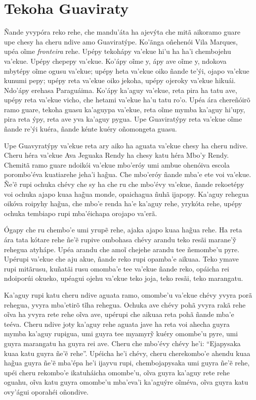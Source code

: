 \chapter*{Tekoha Guaviraty}

Ñande yvypóra reko rehe, che mandu'áta ha ajevýta che mitã aikoramo
guare upe chesy ha cheru ndive amo Guaviratýpe. Ko'ãnga oñehenói Vila
Marques, upéa oĩme \emph{fronteira} rehe. Upépy tekohápy va'ekue hi'u ha
ha'i chembojehu va'ekue. Upépy chepepy va'ekue. Ko'ápy oĩme y, ápy ave
oĩme y, ndokova mbytépy oĩme ogusu va'ekue; upépy heta va'ekue oiko
ñande te'ýi, ojapo va'ekue kunumi pepy; upépy reta va'ekue oiko jekoha,
upépy ojeroky va'ekue hikuái. Ndo'ápy erehasa Paraguáima. Ko'ápy ka'aguy
va'ekue, reta pira ha tatu ave, upépy reta va'ekue vicho, che hetami
va'ekue ha'u tatu ro'o. Upéa ára chereñóirõ ramo guare, tekoha guasu
ka'aguypa va'ekue, reta oĩme mymba ka'aguy hi'upy, pira reta ýpy, reta
ave yva ka'aguy pygua. Upe Guaviratýpy reta va'ekue oĩme ñande re'ýi
kuéra, ñande kénte kuéry oñomongeta guasu.

Upe Guavyratýpy va'ekue reta ary aiko ha aguata va'ekue chesy ha cheru
ndive. Cheru héra va'ekue Ava Jeguaka Rendy ha chesy katu héra Mbo'y
Rendy. Chemitã ramo guare ndoikói va'ekue mbo'eróy umi ambue ohenóiva
escola porombo'éva kuatiarehe jeha'i hag̃ua. Che mbo'eróy ñande mba'e ete
voi va'ekue. Ñe'ẽ rupi ochuka chévy che sy ha che ru che mbo'évy
va'ekue, ñande rekoetépy voi ochuka ajapo kuaa hag̃ua monde, opaichagua
ñuhã ijapopy. Ka'aguy rehegua oikóva roipyhy hag̃ua, che mbo'e renda ha'e
ka'aguy rehe, yrykóta rehe, upépy ochuka tembiapo rupi mba'éichapa
orojapo va'erã.

Ógapy che ru chembo'e umi yrupẽ rehe, ajaka ajapo kuaa hag̃ua rehe. Ha
reta ára tata kótare rehe ñe'ẽ rupive ombohasa chévy arandu teko resãi
marane'ỹ rehegua atyhápe. Upéa arandu che amoĩ chejehe arandu tee
ñemombe'u pyre. Upérupi va'ekue che aju akue, ñande reko rupi opamba'e
aikuaa. Teko ymave rupi mitãrusu, kuñatãi rusu omomba'e tee va'ekue
ñande reko, opáicha rei ndoiporúi okueko, upéagui ojehu va'ekue teko
joja, teko resãi, teko marangatu.

Ka'aguy rupi katu cheru ndive aguata ramo, omombe'u va'ekue chévy yvyra
porã rehegua, yvyra mba'etirõ tĩha rehegua. Ochuka ave chévy pohã yvyra
rakã rehe oĩva ha yvyra rete rehe oĩva ave, upérupi che aikuaa reta pohã
ñande mba'e teéva. Cheru ndive joty ka'aguy rehe aguata jave ha reta voi
ahecha guyra mymba ka'aguy rupigua, umi guyra tee myamyrỹ kuéry omombe'u
pyre, umi guyra marangatu ha guyra rei ave. Cheru che mbo'évy chévy
he'i: ``Ejapysaka kuaa katu guyra ñe'ẽ rehe''. Upéicha he'i chévy, cheru
cherekombo'e ahendu kuaa hag̃ua guyra ñe'ẽ mba'épa he'i ijayvu rupi,
chembojapysaka umi guyra ñe'ẽ rehe, upéi cheru rekombo'e ikatuháicha
omombe'u, oĩva guyra ka'aguy rete rehe oguahu, oĩva katu guyra omombe'u
mba'eva'i ka'aguýre oĩméva, oĩva guyra katu ovy'águi oporahéi oñondive.

